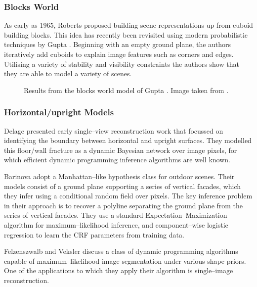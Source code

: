 \subsubsection{Blocks World}

As early as 1965, Roberts \cite{Roberts65} proposed building scene
representations up from cuboid building blocks. This idea has recently
been revisited using modern probabilistic techniques by Gupta \etal
\cite{Gupta10}. Beginning with an empty ground plane, the authors
iteratively add cuboids to explain image features such as corners and
edges. Utilising a variety of stability and visibility constraints
the authors show that they are able to model a variety of scenes.

\begin{figure}[tb]
  \centering
  \caption{Results from the blocks world model of Gupta \etal
    \cite{Gupta10}. Image taken from \cite{Gupta10}.}
  \label{fig:gupta-result}
\end{figure}

\subsubsection{Horizontal/upright Models}

Delage \etal \cite{Delage2006} presented early single--view
reconstruction work that focussed on identifying the boundary between
horizontal and upright surfaces. They modelled this floor/wall
fracture as a dynamic Bayesian network over image pixels, for which
efficient dynamic programming inference algorithms are well known.

Barinova \etal \cite{Barinova08} adopt a Manhattan--like hypothesis
class for outdoor scenes. Their models consist of a ground plane
supporting a series of vertical facades, which they infer using a
conditional random field over pixels. The key inference problem in
their approach is to recover a polyline separating the ground plane
from the series of vertical facades. They use a standard
Expectation--Maximization algorithm for maximum--likelihood inference,
and component--wise logistic regression to learn the CRF parameters
from training data.

Felzenszwalb and Veksler \cite{Felzenszwalb2010} discuss a class of
dynamic programming algorithms capable of maximum--likelihood
image segmentation under various shape priors. One of the applications
to which they apply their algorithm is single--image reconstruction.

